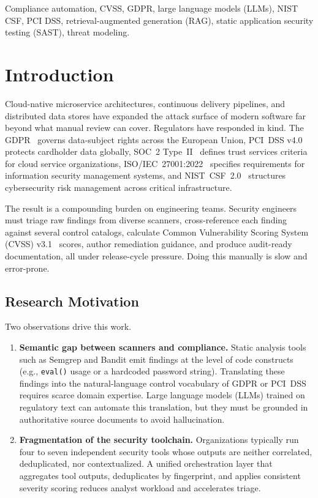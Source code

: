 \documentclass[conference]{IEEEtran}
\begin{document}
\begin{IEEEkeywords}
Compliance automation, CVSS, GDPR, large language models (LLMs), NIST CSF,
PCI DSS, retrieval-augmented generation (RAG), static application security
testing (SAST), threat modeling.
\end{IEEEkeywords}

\section{Introduction}
Cloud-native microservice architectures, continuous delivery
pipelines, and distributed data stores have expanded the attack surface of modern
software far beyond what manual review can cover. Regulators have responded in
kind. The GDPR~\cite{GDPR2016} governs data-subject rights across the European
Union, PCI~DSS v4.0~\cite{PCIDSS4} protects cardholder data globally, SOC~2
Type~II~\cite{SOC2} defines trust services criteria for cloud service
organizations, ISO/IEC~27001:2022~\cite{ISO27001} specifies requirements for
information security management systems, and NIST~CSF~2.0~\cite{NISTCSF2}
structures cybersecurity risk management across critical infrastructure.

The result is a compounding burden on engineering teams. Security engineers must
triage raw findings from diverse scanners, cross-reference each finding against
several control catalogs, calculate Common Vulnerability Scoring System (CVSS)
v3.1~\cite{CVSS31} scores, author remediation guidance, and produce audit-ready
documentation, all under release-cycle pressure. Doing this manually is slow and
error-prone.

\subsection{Research Motivation}
Two observations drive this work.
\begin{enumerate}[leftmargin=*,nosep,label=\arabic*)]
  \item \textbf{Semantic gap between scanners and compliance.} Static analysis
  tools such as Semgrep and Bandit emit findings at the level of code constructs
  (e.g., \texttt{eval()} usage or a hardcoded password string). Translating these
  findings into the natural-language control vocabulary of GDPR or PCI~DSS
  requires scarce domain expertise. Large language models (LLMs) trained on
  regulatory text can automate this translation, but they must be grounded in
  authoritative source documents to avoid hallucination.
  \item \textbf{Fragmentation of the security toolchain.} Organizations typically
  run four to seven independent security tools whose outputs are neither
  correlated, deduplicated, nor contextualized. A unified orchestration layer
  that aggregates tool outputs, deduplicates by fingerprint, and applies
  consistent severity scoring reduces analyst workload and accelerates triage.
\end{enumerate}
\end{document}
